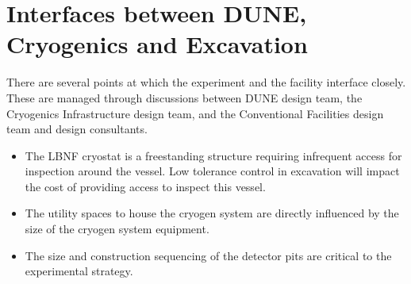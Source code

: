 \section{Interfaces between DUNE, Cryogenics and Excavation}
\label{sec:fscf-excav-interfaces}

There are several points at which the experiment and the facility interface closely. These are managed through discussions between DUNE design team, the Cryogenics Infrastructure design team, and the Conventional Facilities design team and design consultants.
\begin{itemize}
 \item The LBNF cryostat is a freestanding structure requiring infrequent access for inspection around the vessel. Low tolerance control in excavation will impact the cost of providing access to inspect this vessel.
 \item The utility spaces to house the cryogen system are directly influenced by the size of the cryogen system equipment.
 \item The size and construction sequencing of the detector pits are critical to the experimental strategy.
\end{itemize}


